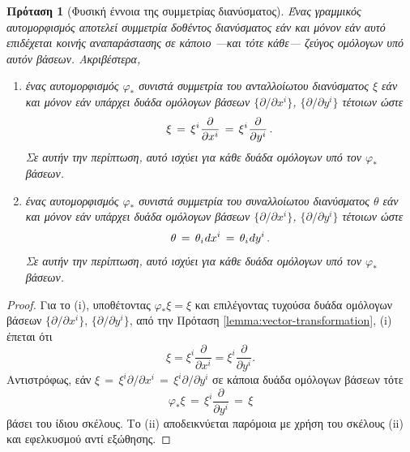 \documentclass[11pt,a4paper,twoside,openright]{book}
\newtheorem{proposition}[lemma]{Πρόταση}
\begin{document}
\begin{proposition}[Φυσική έννοια της συμμετρίας διανύσματος]
	\label{prop:symmetries-contravariant-vector}
Ένας γραμμικός αυτομορφισμός αποτελεί συμμετρία δοθέντος διανύσματος εάν και μόνον εάν αυτό επιδέχεται κοινής αναπαράστασης σε κάποιο ---και τότε κάθε--- ζεύγος ομόλογων υπό αυτόν βάσεων.
Ακριβέστερα,
\begin{enumerate}[label=(\roman*), leftmargin=0pt, itemindent=*, align=left]
    \item[\textup{(i)}]
    	ένας αυτομορφισμός $\varphi_*$ συνιστά συμμετρία του ανταλλοίωτου διανύσματος $\xi$ εάν και μόνον εάν υπάρχει δυάδα ομόλογων βάσεων $\{\partial/\partial x^i\}$, $\{\partial/\partial y^i\}$ τέτοιων ώστε
    	\begin{equation}\label{eq:covariant-vector-invariance}
    		\xi
    		\,=\,
    		\xi^i\hspace{.5pt}\frac{\partial}{\partial x^i}
    		\,=\,
    		\xi^i\hspace{.5pt}\frac{\partial}{\partial y^i}\,.
    	\end{equation}
    Σε αυτήν την περίπτωση, αυτό ισχύει για κάθε δυάδα ομόλογων υπό τον $\varphi_*$ βάσεων.
    \item[\textup{(ii)}]
		ένας αυτομορφισμός $\varphi_*$ συνιστά συμμετρία του συναλλοίωτου διανύσματος $\theta$ εάν και μόνον εάν υπάρχει δυάδα ομόλογων βάσεων $\{\partial/\partial x^i\}$, $\{\partial/\partial y^i\}$ τέτοιων ώστε
    	\begin{equation}\label{eq:cotravariant-vector-invariance}
    		\theta
    		\,=\,
    		\theta_i\hspace{.5pt}dx^i
    		\,=\,
    		\theta_i\hspace{.5pt}dy^i\,.
    	\end{equation}
    Σε αυτήν την περίπτωση, αυτό ισχύει για κάθε δυάδα ομόλογων υπό τον $\varphi_*$ βάσεων.
\end{enumerate}
\end{proposition}

\begin{proof}
Για το (i), υποθέτοντας $\varphi_* \xi = \xi$ και επιλέγοντας τυχούσα δυάδα ομόλογων βάσεων $\{\partial/\partial x^i\}$, $\{\partial/\partial y^i\}$, από την Πρόταση \ref{lemma:vector-transformation}, (i) έπεται ότι
\begin{equation*}
\xi = \xi^i \frac{\partial}{\partial x^i} = \xi^i \frac{\partial}{\partial y^i}.
\end{equation*}
Αντιστρόφως, εάν $\xi \,=\, \xi^i \partial/\partial x^i \,=\, \xi^i \partial/\partial y^i$ σε κάποια δυάδα ομόλογων βάσεων τότε
\begin{equation*}
\varphi_* \xi \,=\, \xi^i \frac{\partial}{\partial y^i} \,=\, \xi
\end{equation*}
βάσει του ίδιου σκέλους. Το (ii) αποδεικνύεται παρόμοια με χρήση του σκέλους (ii) και εφελκυσμού αντί εξώθησης.
\end{proof}
\end{document}
